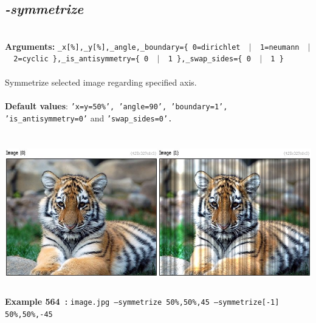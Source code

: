 \documentclass[a4paper,11pt,twoside]{book}
\begin{document}
\subsection{\emph{-symmetrize} }\vspace*{-0.5em}
~\\\textbf{Arguments: } 
{\small \texttt{\_x[\%],\_y[\%],\_angle,\_boundary=\{ 0=dirichlet ~$|$~ 1=neumann ~$|$~ 2=cyclic \},\_is\_antisymmetry=\{ 0 ~$|$~ 1 \},\_swap\_sides=\{ 0 ~$|$~ 1 \}}}\\~\\
Symmetrize selected image regarding specified axis.
~\\~\\\textbf{Default values}: {\small \texttt{'x=y=50\%', 'angle=90', 'boundary=1', 'is\_antisymmetry=0'} and \texttt{'swap\_sides=0'.}}
\begin{center}\includegraphics[keepaspectratio=true,height=7cm,width=\textwidth]{img/gmic_def564.jpg}\\
{\footnotesize \textbf{Example 564~:} \texttt{image.jpg --symmetrize 50\%,50\%,45 --symmetrize[-1] 50\%,50\%,-45}}
\end{center}
\end{document}
